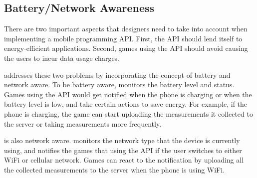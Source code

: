 \subsection{Battery/Network Awareness}
\label{ss:awareness}
There are two important aspects that designers need to take into account when implementing a mobile
programming API. First, the API should lend itself to energy-efficient applications.
Second, games using the API should avoid causing the users to incur data usage charges.

\name{} addresses these two problems by incorporating the concept of battery and network aware.
To be battery aware, \name{} monitors the battery level and status. Games using the API would get
notified when the phone is charging or when the battery level is low, and take certain actions
to save energy. For example, if the phone is charging, the game can start uploading the measurements
it collected to the server or taking measurements more frequently.

\name{} is also network aware. \name{} monitors the network type that the device is currently using,
and notifies the games that using the API if the user switches to either WiFi or cellular network.
Games can react to the notification by uploading all the collected measurements to the server when
the phone is using WiFi.

